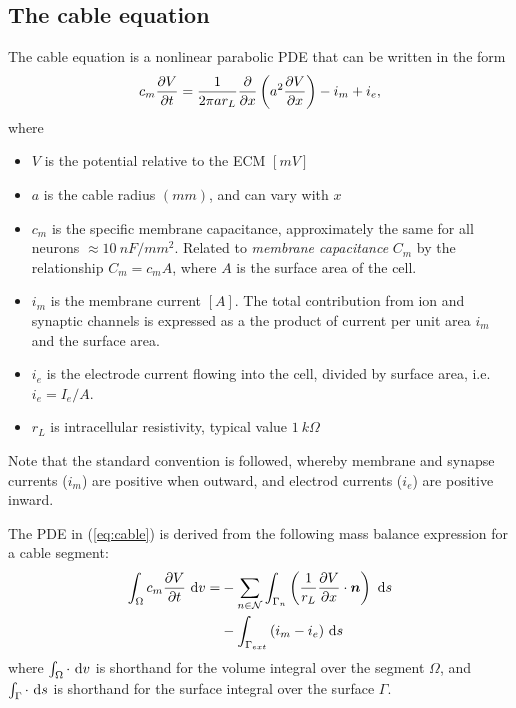 \subsection{The cable equation}
The cable equation is a nonlinear parabolic PDE that can be written in the form
\begin{equation}
    \label{eq:cable}
    c_m \frac{\partial{V}}{\partial{t}} = \frac{1}{2\pi a r_{L}} \frac{\partial{}}{\partial{x}} \left( a^2 \frac{\partial{V}}{\partial{x}} \right) - i_m + i_e,
\end{equation}
where
\begin{itemize}
    \item $V$ is the potential relative to the ECM $[mV]$
    \item $a$ is the cable radius $(mm)$, and can vary with $x$
    \item $c_m$ is the {specific membrane capacitance}, approximately the same for all neurons $\approx 10~nF/mm^2$. Related to \emph{membrane capacitance} $C_m$ by the relationship $C_m=c_{m}A$, where $A$ is the surface area of the cell.
    \item $i_m$ is the membrane current $[A]$. The total contribution from ion and synaptic channels is expressed as a the product of current per unit area $i_m$ and the surface area.
    \item $i_e$ is the electrode current flowing into the cell, divided by surface area, i.e. $i_e=I_e/A$.
    \item $r_L$ is intracellular resistivity, typical value $1~k\Omega$
\end{itemize}

Note that the standard convention is followed, whereby membrane and synapse currents ($i_m$) are positive when outward, and electrod currents ($i_e$) are positive inward.

The PDE in (\ref{eq:cable}) is derived from the following mass balance expression for a cable segment:
\begin{align}
    \int_{\Omega}{c_m \frac{\partial{V}}{\partial{t}} } ~\text{d}{v} =
        & - \sum_{n\in\mathcal{N}} {\int_{\Gamma_{n}}  \left( \frac{1}{r_L}\frac{\partial{V}}{\partial{x}} \cdot \bm{n} \right) ~\text{d}{s} } \nonumber \\
        & - \int_{\Gamma_{ext}} {(i_m - i_e)} ~\text{d}{s}
    \label{eq:cable_balance}
\end{align}
where $\int_\Omega \cdot ~\text{d}{v}$ is shorthand for the volume  integral over the segment $\Omega$, and $\int_\Gamma \cdot ~\text{d}{s}$ is shorthand for the surface integral over the surface $\Gamma$.

